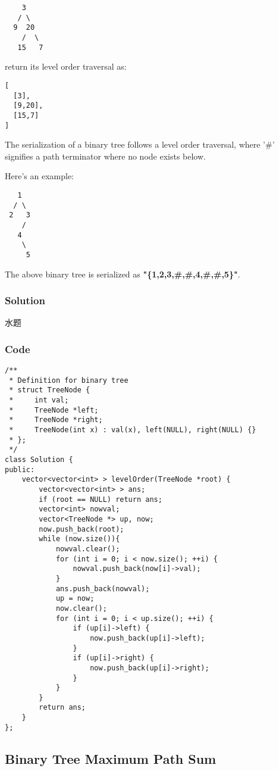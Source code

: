 \documentclass[courier]{article}
\begin{document}
\begin{CJK*}{UTF8}{gkai}
\begin{verbatim}
    3
   / \
  9  20
    /  \
   15   7
\end{verbatim}

return its level order traversal as:


\begin{verbatim}
[
  [3],
  [9,20],
  [15,7]
]
\end{verbatim}

The serialization of a binary tree follows a level order traversal, where '\#' signifies a path terminator where no node exists below.

Here's an example:


\begin{verbatim}
   1
  / \
 2   3
    /
   4
    \
     5
\end{verbatim}
The above binary tree is serialized as \textbf{"\{1,2,3,\#,\#,4,\#,\#,5\}"}.



\subsubsection*{Solution}
水题

\subsubsection*{Code}
\begin{lstlisting}
/**
 * Definition for binary tree
 * struct TreeNode {
 *     int val;
 *     TreeNode *left;
 *     TreeNode *right;
 *     TreeNode(int x) : val(x), left(NULL), right(NULL) {}
 * };
 */
class Solution {
public:
    vector<vector<int> > levelOrder(TreeNode *root) {
        vector<vector<int> > ans;
        if (root == NULL) return ans;
        vector<int> nowval;
        vector<TreeNode *> up, now;
        now.push_back(root);
        while (now.size()){
            nowval.clear();
            for (int i = 0; i < now.size(); ++i) {
                nowval.push_back(now[i]->val);
            }
            ans.push_back(nowval);
            up = now;
            now.clear();
            for (int i = 0; i < up.size(); ++i) {
                if (up[i]->left) {
                    now.push_back(up[i]->left);
                }
                if (up[i]->right) {
                    now.push_back(up[i]->right);
                }
            }
        }
        return ans;
    }
}; 
\end{lstlisting}


\subsection{ Binary Tree Maximum Path Sum }


\end{CJK*}
\end{document}
